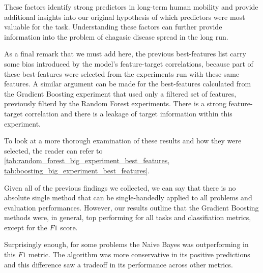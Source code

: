 These factors identify strong predictors in long-term human mobility and provide additional insights into our original hypothesis of which predictors were most valuable for the task.
Understanding these factors can further provide information into the problem of chagasic disease spread in the long run.

As a final remark that we must add here, the previous best-features list carry some bias introduced by the model's feature-target correlations, because part of these best-features were selected from the experiments run with these same features.
A similar argument can be made for the best-features calculated from the Gradient Boosting experiment that used only a filtered set of features, previously filterd by the Random Forest experiments.
There is a strong feature-target correlation and there is a leakage of target information within this experiment.

To look at a more thorough examination of these results and how they were selected, the reader can refer to \cref{tab:random_forest_big_experiment_best_features, tab:boosting_big_experiment_best_features}.





Given all of the previous findings we collected, we can say that there is no absolute single method that can be single-handedly applied to all problems and evaluation performances.
However, our results outline that the Gradient Boosting methods were, in general, top performing for all tasks and classifiation metrics, except for the $F1$ score.

Surprisingly enough, for some problems the Naive Bayes was outperforming in this $F1$ metric.
The algorithm was more conservative in its positive predictions and this difference saw a tradeoff in its performance across other metrics.


